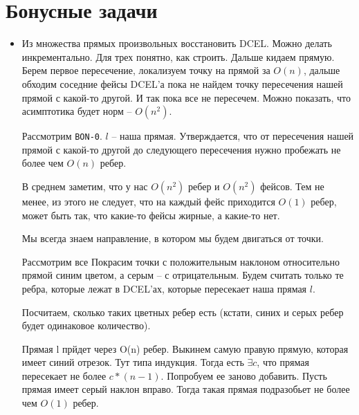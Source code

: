 \documentclass[11pt]{article}
\begin{document}
\section{Бонусные задачи}
\label{sec-25}
\begin{itemize}
\item Из множества прямых произвольных восстановить DCEL. Можно делать
инкрементально. Для трех понятно, как строить. Дальше кидаем
прямую. Берем первое пересечение, локализуем точку на прямой за
$O(n)$, дальше обходим соседние фейсы DCEL'а пока не найдем точку
пересечения нашей прямой с какой-то другой. И так пока все не
пересечем. Можно показать, что асимптотика будет норм --
$O(n^2)$.

Рассмотрим \verb~BON-0~. $l$ -- наша прямая. Утверждается, что от
пересечения нашей прямой с какой-то другой до следующего
пересечения нужно пробежать не более чем $O(n)$ ребер.

В среднем заметим, что у нас $O(n^2)$ ребер и $O(n^2)$ фейсов. Тем не
менее, из этого не следует, что на каждый фейс приходится $O(1)$
ребер, может быть так, что какие-то фейсы жирные, а какие-то нет.

Мы всегда знаем направление, в котором мы будем двигаться от
точки.

Рассмотрим все Покрасим точки с положительным наклоном
относительно прямой синим цветом, а серым -- с
отрицательным. Будем считать только те ребра, которые лежат в
DCEL'ах, которые пересекает наша прямая $l$.

Посчитаем, сколько таких цветных ребер есть (кстати, синих и серых
ребер будет одинаковое количество).

Прямая l прйдет через O(n) ребер. Выкинем самую правую прямую,
которая имеет синий отрезок. Тут типа индукция. Тогда есть
$\exists{c}$, что прямая пересекает не более $c*(n-1)$. Попробуем ее
заново добавить. Пусть прямая имеет серый наклон вправо. Тогда
такая прямая подразобьет не более чем $O(1)$ ребер.
\end{itemize}
\end{document}
